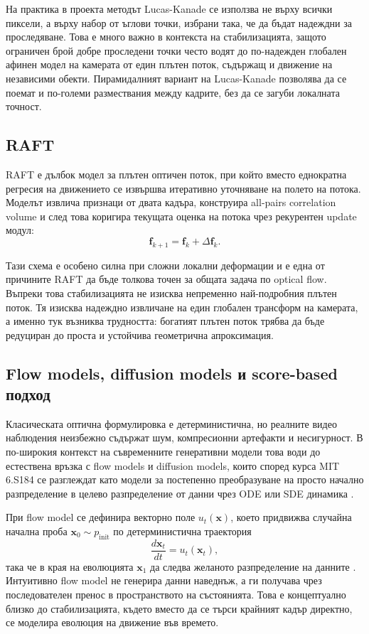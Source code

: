\documentclass[12pt,a4paper]{article}
\begin{document}
На практика в проекта методът Lucas-Kanade се използва не върху всички пиксели, а върху набор от ъглови точки, избрани така, че да бъдат надеждни за проследяване. Това е много важно в контекста на стабилизацията, защото ограничен брой добре проследени точки често водят до по-надежден глобален афинен модел на камерата от един плътен поток, съдържащ и движение на независими обекти. Пирамидалният вариант на Lucas-Kanade позволява да се поемат и по-големи размествания между кадрите, без да се загуби локалната точност.

\subsection{RAFT}
RAFT е дълбок модел за плътен оптичен поток, при който вместо еднократна регресия на движението се извършва итеративно уточняване на полето на потока. Моделът извлича признаци от двата кадъра, конструира all-pairs correlation volume и след това коригира текущата оценка на потока чрез рекурентен update модул:
\begin{equation}
\mathbf{f}_{k+1} = \mathbf{f}_k + \Delta \mathbf{f}_k.
\end{equation}

Тази схема е особено силна при сложни локални деформации и е една от причините RAFT да бъде толкова точен за общата задача по optical flow. Въпреки това стабилизацията не изисква непременно най-подробния плътен поток. Тя изисква надеждно извличане на един глобален трансформ на камерата, а именно тук възниква трудността: богатият плътен поток трябва да бъде редуциран до проста и устойчива геометрична апроксимация.

\subsection{Flow models, diffusion models и score-based подход}
Класическата оптична формулировка е детерминистична, но реалните видео наблюдения неизбежно съдържат шум, компресионни артефакти и несигурност. В по-широкия контекст на съвременните генеративни модели това води до естествена връзка с flow models и diffusion models, които според курса MIT 6.S184 се разглеждат като модели за постепенно преобразуване на просто начално разпределение в целево разпределение от данни чрез ODE или SDE динамика \cite{mitcourse2026,mitnotes2026}.

При flow model се дефинира векторно поле \(u_t(\mathbf{x})\), което придвижва случайна начална проба \(\mathbf{x}_0 \sim p_{\mathrm{init}}\) по детерминистична траектория
\begin{equation}
\frac{d\mathbf{x}_t}{dt} = u_t(\mathbf{x}_t),
\end{equation}
така че в края на еволюцията \(\mathbf{x}_1\) да следва желаното разпределение на данните \cite{mitnotes2026}. Интуитивно flow model не генерира данни наведнъж, а ги получава чрез последователен пренос в пространството на състоянията. Това е концептуално близко до стабилизацията, където вместо да се търси крайният кадър директно, се моделира еволюция на движение във времето.
\end{document}
